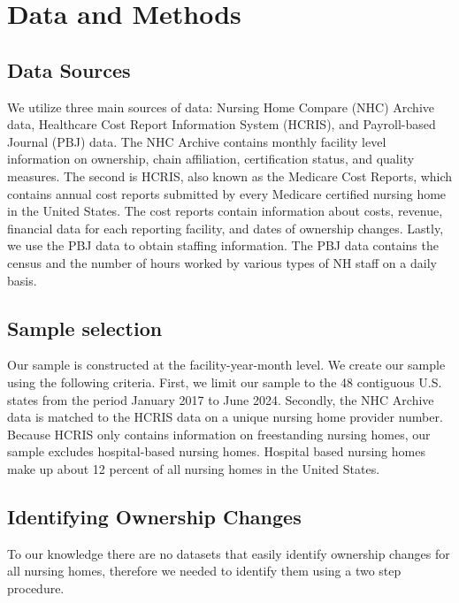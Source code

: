 \documentclass[preprint,authoryear]{elsarticle}
\begin{document}
\section{Data and Methods}
\subsection{Data Sources}
We utilize three main sources of data: Nursing Home Compare (NHC) Archive data, Healthcare Cost Report Information System (HCRIS), and Payroll-based Journal (PBJ) data. The NHC Archive contains monthly facility level information on ownership, chain affiliation, certification status, and quality measures. The second is HCRIS, also known as the Medicare Cost Reports, which contains annual cost reports submitted by every Medicare certified nursing home in the United States. The cost reports contain information about costs, revenue, financial data for each reporting facility, and dates of ownership changes. Lastly, we use the PBJ data to obtain staffing information. The PBJ data contains the census and the number of hours worked by various types of NH staff on a daily basis.

\subsection{Sample selection}

Our sample is constructed at the facility-year-month level. We create our sample using the following criteria. First, we limit our sample to the 48 contiguous U.S. states from the period January 2017 to June 2024. Secondly, the NHC Archive data is matched to the HCRIS data on a unique nursing home provider number. Because HCRIS only contains information on freestanding nursing homes, our sample excludes hospital-based nursing homes. Hospital based nursing homes make up about 12 percent of all nursing homes in the United States. 


\subsection{Identifying Ownership Changes}

To our knowledge there are no datasets that easily identify ownership changes for all nursing homes, therefore we needed to identify them using a two step procedure. 
\end{document}
